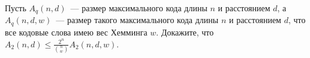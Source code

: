 Пусть $A_q(n, d)$~--- размер максимального кода длины $n$ и расстоянием $d$, а $A_q(n, d, w)$~--- размер такого максимального
кода длины $n$ и расстоянием $d$, что все кодовые слова имею вес Хемминга $w$. Докажите, что $A_2(n, d) \le
\frac{2^n}{\binom{n}{w}} A_2(n, d, w)$.